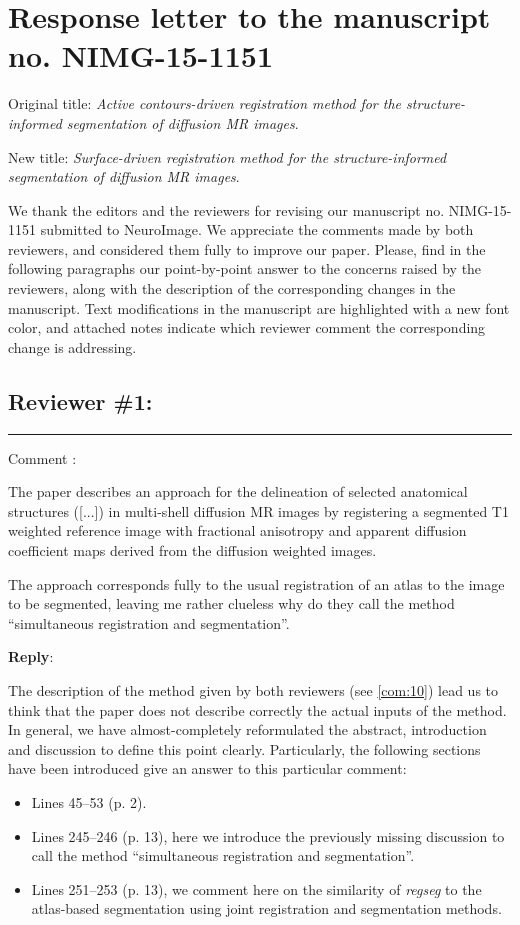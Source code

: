\documentclass[9pt]{memoir}
\newcounter{reviewpoint}
\newenvironment{reviewpoint}%
{\refstepcounter{reviewpoint}\par\medskip\vspace{3ex}\hrule\vspace{1.5ex}\par\noindent%
   {\fontseries{b}\selectfont Comment \arabic{reviewpoint}:}
   \begingroup%
   \color{black!60}
   \fontshape{it}\selectfont %

}
{\endgroup\label{com:\thereviewpoint}\par\medskip}
\newcommand{\reply}{\par\fontshape{n}\selectfont \noindent \textbf{Reply}:\ }
\begin{document}
\section*{Response letter to the manuscript no. NIMG-15-1151}
\medskip
Original title: \emph{Active contours-driven registration method for the structure-informed segmentation of
  diffusion MR images}.

\noindent New title: \emph{{\color{blue!70} Surface}-driven registration method for the structure-informed segmentation of
  diffusion MR images}.

\bigskip
\noindent We thank the editors and the reviewers for revising our manuscript no. NIMG-15-1151 submitted to NeuroImage.
We appreciate the comments made by both reviewers, and considered them fully to improve our paper.
Please, find in the following paragraphs our point-by-point answer to the concerns raised by the reviewers,
  along with the description of the corresponding changes in the manuscript.
Text modifications in the manuscript are highlighted with a new font color, and attached notes indicate which reviewer comment
  the corresponding change is addressing.

\bigskip
\bigskip
\subsection*{Reviewer \#1:}
\begin{reviewpoint}
The paper describes an approach for the delineation of selected anatomical structures ([...]) in multi-shell diffusion MR images
  by registering a segmented T1 weighted reference image with fractional anisotropy and apparent diffusion coefficient maps derived
  from the diffusion weighted images.

The approach corresponds fully to the usual registration of an atlas to the image to be segmented, leaving me rather clueless why do
  they call the method ``simultaneous registration and segmentation''.

\end{reviewpoint}
\reply{%
The description of the method given by both reviewers (see \autoref{com:10}) lead us to think that the paper
  does not describe correctly the actual inputs of the method.
In general, we have almost-completely reformulated the abstract, introduction and discussion to define this
  point clearly.
Particularly, the following sections have been introduced give an answer to this particular comment:
\begin{itemize}
\item Lines 45--53 (p. 2).
\item Lines 245--246 (p. 13), here we introduce the previously missing discussion to call the
  method ``simultaneous registration and segmentation''.
\item Lines 251--253 (p. 13), we comment here on the similarity of \emph{regseg} to the atlas-based segmentation
  using joint registration and segmentation methods.
\end{itemize}
}
\end{document}
